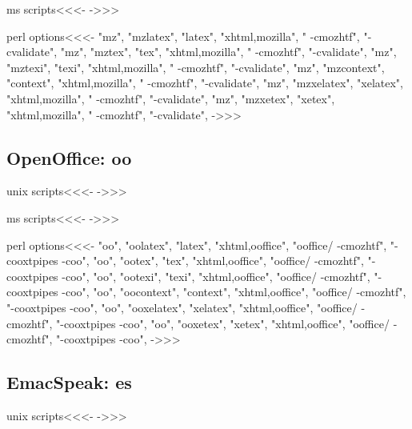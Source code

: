 \documentclass{article}
\begin{document}
\<ms scripts\><<<-
->>>


\<perl options\><<<-
 "mz", "mzlatex",   "latex",   "xhtml,mozilla", " -cmozhtf",  "-cvalidate",
 "mz", "mztex",     "tex",     "xhtml,mozilla", " -cmozhtf",  "-cvalidate",
 "mz", "mztexi",    "texi",    "xhtml,mozilla", " -cmozhtf",  "-cvalidate",
 "mz", "mzcontext", "context", "xhtml,mozilla", " -cmozhtf",  "-cvalidate",
 "mz", "mzxelatex", "xelatex",   "xhtml,mozilla", " -cmozhtf",  "-cvalidate",
 "mz", "mzxetex",   "xetex",     "xhtml,mozilla", " -cmozhtf",  "-cvalidate",
->>>


\subsection{OpenOffice: oo}

\<unix scripts\><<<-
->>>

\<ms scripts\><<<-
->>>


\<perl options\><<<-
 "oo", "oolatex",   "latex",   "xhtml,ooffice", "ooffice/\! -cmozhtf",  "-cooxtpipes -coo",
 "oo", "ootex",     "tex",     "xhtml,ooffice", "ooffice/\! -cmozhtf",  "-cooxtpipes -coo",
 "oo", "ootexi",    "texi",    "xhtml,ooffice", "ooffice/\! -cmozhtf",  "-cooxtpipes -coo",
 "oo", "oocontext", "context", "xhtml,ooffice", "ooffice/\! -cmozhtf",  "-cooxtpipes -coo",
 "oo", "ooxelatex",   "xelatex",   "xhtml,ooffice", "ooffice/\! -cmozhtf",  "-cooxtpipes -coo",
 "oo", "ooxetex",     "xetex",     "xhtml,ooffice", "ooffice/\! -cmozhtf",  "-cooxtpipes -coo",
->>>





\subsection{EmacSpeak: es}

\<unix scripts\><<<-
->>>
\end{document}
